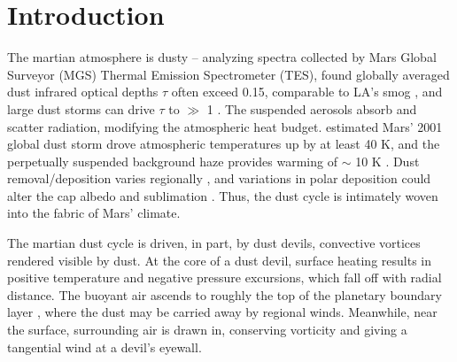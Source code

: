 \documentclass{aastex63}
\begin{document}

\section{Introduction} \label{sec:introduction}
The martian atmosphere is dusty -- analyzing spectra collected by Mars Global Surveyor (MGS) Thermal Emission Spectrometer (TES), \citet{2004Icar..167..148S} found globally averaged dust infrared optical depths $\tau$ often exceed 0.15, comparable to LA's smog \citep{2007JGRD..11222S21R}, and large dust storms can drive $\tau$ to $\gg$ 1 \citep{2002Icar..157..259S}. The suspended aerosols absorb and scatter radiation, modifying the atmospheric heat budget. \citet{2002Icar..157..259S} estimated Mars' 2001 global dust storm drove atmospheric temperatures up by at least 40 K, and the perpetually suspended background haze provides warming of $\sim$ 10 K \citep{2004JGRE..10911006B}. Dust removal/deposition varies regionally \citep{2006JGRE..111.6008K}, and variations in polar deposition could alter the cap albedo and sublimation \citep{1995JGR...100.5501H}. Thus, the dust cycle is intimately woven into the fabric of Mars' climate.

The martian dust cycle is driven, in part, by dust devils, convective vortices rendered visible by dust. At the core of a dust devil, surface heating results in positive temperature and negative pressure excursions, which fall off with radial distance. The buoyant air ascends to roughly the top of the planetary boundary layer \citep{1998JAtS...55.3244R}, where the dust may be carried away by regional winds. Meanwhile, near the surface, surrounding air is drawn in, conserving vorticity and giving a tangential wind at a devil's eyewall. 
\end{document}

